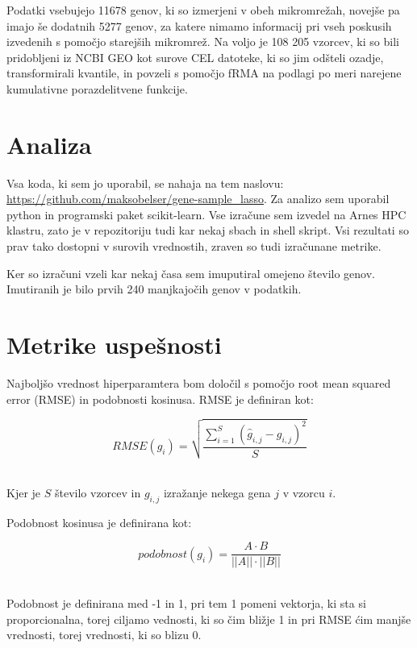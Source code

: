 \documentclass[onecolumn]{report}
\begin{document}
Podatki vsebujejo 11678 genov, ki so izmerjeni v obeh mikromrežah, novejše pa imajo še dodatnih 5277 genov, za katere nimamo informacij pri vseh poskusih izvedenih s pomočjo starejših mikromrež. Na voljo je 108 205 vzorcev, ki so bili pridobljeni iz NCBI GEO kot surove CEL datoteke, ki so jim odšteli ozadje, transformirali kvantile, in povzeli s pomočjo fRMA na podlagi po meri narejene kumulativne porazdelitvene funkcije.

\section*{Analiza}

Vsa koda, ki sem jo uporabil, se nahaja na tem naslovu: \url{https://github.com/maksobelser/gene-sample_lasso}. Za analizo sem uporabil python in programski paket scikit-learn. Vse izračune sem izvedel na Arnes HPC klastru, zato je v repozitoriju tudi kar nekaj sbach in shell skript. Vsi rezultati so prav tako dostopni v surovih vrednostih, zraven so tudi izračunane metrike.

Ker so izračuni vzeli kar nekaj časa sem imuputiral omejeno število genov. Imutiranih je bilo prvih 240 manjkajočih genov v podatkih. 

\section*{Metrike uspešnosti}

Najboljšo vrednost hiperparamtera bom določil s pomočjo root mean squared error (RMSE) in podobnosti kosinusa. RMSE je definiran kot:

\begin{equation}
	RMSE(g_i) = \sqrt{\dfrac{\sum_{i = 1}^{S}(\hat{g}_{i, j} - g_{i, j})^2}{S}}
	\label{eqn6} 
\end{equation}

\ \\

Kjer je $S$ število vzorcev in $g_{i, j}$ izražanje nekega gena $j$ v vzorcu $i$.

Podobnost kosinusa je definirana kot:

\begin{equation}
	podobnost(g_i) = \dfrac{A \cdot B}{||A||\cdot||B||}
	\label{eqn7} 
\end{equation}

\ \\

Podobnost je definirana med -1 in 1, pri tem 1 pomeni vektorja, ki sta si proporcionalna, torej ciljamo vednosti, ki so čim bližje 1 in pri RMSE ćim manjše vrednosti, torej vrednosti, ki so blizu 0.
\end{document}
